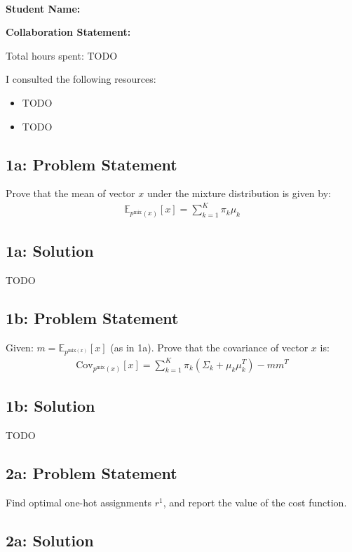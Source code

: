 \documentclass[10pt]{article}
\newcommand{\officialdirections}[1]{{\color{blue} #1}}
\begin{document}
~~\\ %
\Large{\bf Student Name:}

\Large{\bf Collaboration Statement:}

Total hours spent: TODO

I consulted the following resources:
\begin{itemize}
\item TODO
\item TODO
\end{itemize}

\tableofcontents


\newpage
\officialdirections{
\subsection*{1a: Problem Statement}
Prove that the mean of vector $x$ under the mixture distribution is given by:
\begin{align}
\mathbb{E}_{p^{\text{mix}}(x)}[x] = \sum_{k=1}^K \pi_k \mu_k
\end{align}
}

\subsection{1a: Solution}
TODO

\newpage
\officialdirections{
\subsection*{1b: Problem Statement}
Given: $m = \mathbb{E}_{p^{\text{mix}(x)}}[x]$ (as in 1a).
Prove that the covariance of vector $x$ is:
\begin{align}
\text{Cov}_{p^{\text{mix}}(x)}[x] = \sum_{k=1}^K \pi_k (\Sigma_k + \mu_k \mu_k^T ) - m m^T
\end{align}
}
\subsection{1b: Solution}
TODO
 
 
\newpage
\officialdirections{
\subsection*{2a: Problem Statement}
Find optimal one-hot assignments $r^1$, and report the value of the cost function.
}
\subsection{2a: Solution}
\end{document}

